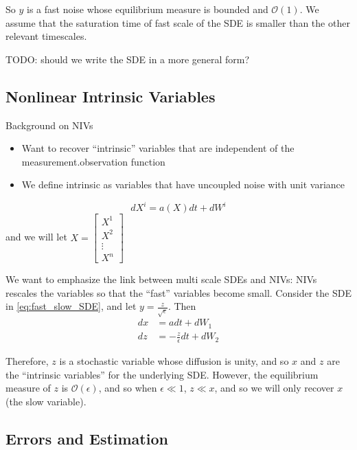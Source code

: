 \documentclass[1p]{elsarticle}
\begin{document}
So $y$ is a fast noise whose equilibrium measure is bounded and $\mathcal{O}(1)$.
%
We assume that the saturation time of fast scale  of the SDE is smaller than the other relevant timescales.

TODO: should we write the SDE in a more general form?

\subsection{Nonlinear Intrinsic Variables}

Background on NIVs 	
\begin{itemize}

\item Want to recover ``intrinsic'' variables that are independent of the measurement.observation function
\item We define intrinsic as variables that have uncoupled noise with unit variance
\end{itemize}

\begin{equation}
dX^i = a(X) dt + dW^i
\end{equation}
and we will let $X = \begin{bmatrix} X^1 \\ X^2 \\ \vdots \\ X^n \end{bmatrix}$

We want to emphasize the link between multi scale SDEs and NIVs: NIVs rescales the variables so that the ``fast'' variables become small.
%
Consider the SDE in \eqref{eq:fast_slow_SDE}, and let $y = \frac{z}{\sqrt{\epsilon}}$. 
%
Then
\begin{equation}
\begin{aligned}
dx &= adt + dW_1\\
dz &= -\frac{z}{\epsilon} dt +  dW_2
\end{aligned}
\end{equation}
%


Therefore, $z$ is a stochastic variable whose diffusion is unity, and so $x$ and $z$ are the ``intrinsic variables'' for the underlying SDE.
%
However, the equilibrium measure of $z$ is $\mathcal{O}(\epsilon)$, and so when $\epsilon \ll 1$, $z \ll x$, and so we will only recover $x$ (the slow variable). 

\subsection{Errors and Estimation}
\end{document}
